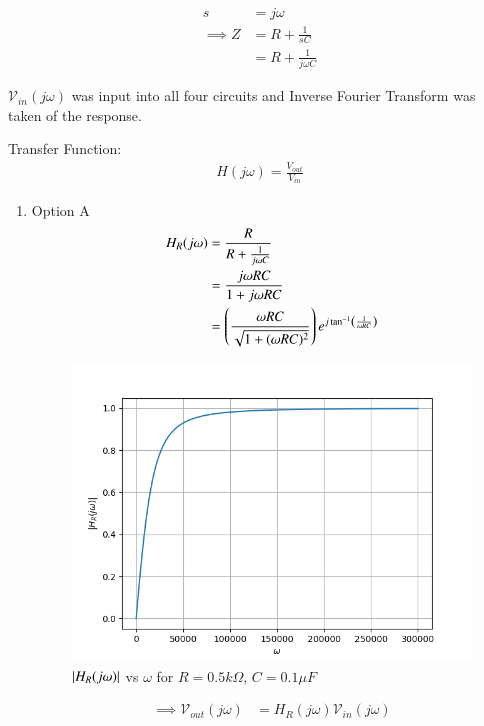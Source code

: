\documentclass[journal,12pt,twocolumn]{IEEEtran}
\theoremstyle{remark}
\begin{document}

\begin{align}
    s &= j\omega\\
    \implies Z &= R + \frac{1}{sC}\\
    &= R + \frac{1}{j\omega C}
\end{align}

$\mathcal{V}_{in}(j\omega)$ was input into all four circuits and Inverse Fourier Transform was taken of the response.

Transfer Function:
\begin{align}
    H(j\omega) = \frac{V_{out}}{V_{in}}
\end{align}
\begin{enumerate}
    \item Option A
    \begin{align}
        H_R(j\omega) &=  \frac{R}{R + \frac{1}{j\omega C}}\\
        &= \frac{j\omega RC}{1+j\omega RC}\\
        &= \left(\frac{\omega R C}{\sqrt{1 + (\omega R C)^2}}\right)e^{j\tan^{-1}\left(\frac{1}{\omega RC}\right)}\label{eq:13_gate.23.ph.37}
    \end{align}
    \begin{figure}[!h]
        \centering
        \includegraphics[width=\columnwidth]{figs/opt_a_hf.png}
        \caption{$\left\vert H_R(j\omega)\right\vert$ vs $\omega$ for $R=0.5k\Omega$, $C=0.1\mu F$}
        \label{fig:opt_a_hf_gate.ph.23.37}
    \end{figure}
    \begin{align}
        \implies \mathcal{V}_{out}(j\omega) &= H_R(j\omega)\mathcal{V}_{in}(j\omega)\\

\end{align}
\end{enumerate}
\end{document}
